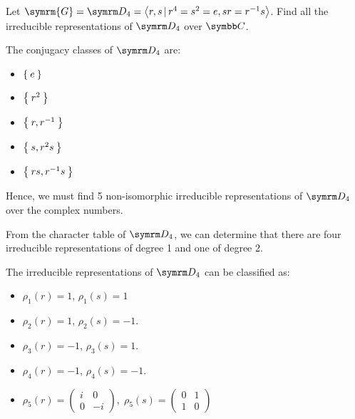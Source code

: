 \begin{exercise}
Let \(\symrm{G} = \dihedralgroup{4} = \generatedby{ r, s \vbar r^4 = s^2 = e, sr = r^{-1} s }\). Find all the irreducible representations of \(\dihedralgroup{4}\) over \(\complex\).
\end{exercise}
\begin{solution}
The conjugacy classes of \(\dihedralgroup{4}\) are:
\begin{itemize}
    \item \(\Set{e}\)
    \item \(\Set{r^2}\)
    \item \(\Set{r, r^{-1}}\)
    \item \(\Set{s, r^2 s}\)
    \item \(\Set{ rs, r^{-1}s }\)
\end{itemize}
Hence, we must find 5 non-isomorphic irreducible representations of \(\dihedralgroup{4}\) over the complex numbers.

From the character table of \(\dihedralgroup{4}\), we can determine that there are four irreducible representations of degree 1 and one of degree 2.

The irreducible representations of \(\dihedralgroup{4}\) can be classified as:
\begin{itemize}
    \item \(\rho_1 (r) = 1\), \(\rho_1 (s) = 1\)
    
    \item \(\rho_2 (r) = 1\), \(\rho_2 (s) = -1\).
    
    \item \(\rho_3 (r) = -1\), \(\rho_3 (s) = 1\).
    
    \item \(\rho_4 (r) = -1\), \(\rho_4 (s) = -1\).
    
    \item 
    \(
        \rho_5 (r) = \begin{pmatrix}
            i & 0 \\
            0 & -i
        \end{pmatrix},
        \;
        \rho_5 (s) = \begin{pmatrix}
            0 & 1 \\
            1 & 0
        \end{pmatrix}
    \)
\end{itemize}
\end{solution}